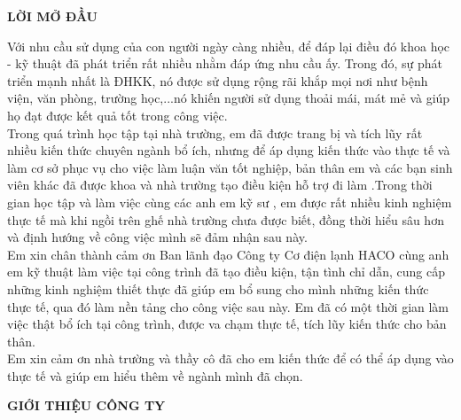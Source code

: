 \documentclass[12pt,a4paper]{article}
\begin{document}
   \begin{center}
  {\Huge \textbf{LỜI MỞ ĐẦU }}
   \end{center}
   
Với nhu cầu sử dụng của con người ngày càng nhiều, để đáp lại điều đó khoa học - kỹ thuật đã phát triển rất nhiều nhằm đáp ứng nhu cầu ấy. Trong đó, sự phát triển mạnh nhất là ĐHKK, nó được sử dụng rộng rãi khắp mọi nơi như bệnh viện, văn phòng, trường học,...nó khiến người sử dụng thoải mái, mát mẻ và giúp họ đạt được kết quả tốt trong công việc.\\

Trong quá trình học tập tại nhà trường, em đã được trang bị và tích lũy rất nhiều kiến thức chuyên ngành bổ ích, nhưng để áp dụng kiến thức vào thực tế và làm cơ sở phục vụ cho việc làm luận văn tốt nghiệp, bản thân em và các bạn sinh viên khác đã được khoa và nhà trường tạo điều kiện hỗ trợ đi làm .Trong thời gian học tập và làm việc cùng các anh em kỹ sư , em được rất nhiều kinh nghiệm thực tế mà khi ngồi trên ghế nhà trường chưa được biết, đồng thời hiểu sâu hơn và định hướng về công việc mình sẽ đảm nhận sau này.\\

Em xin chân thành cảm ơn Ban lãnh đạo Công ty Cơ điện lạnh HACO cùng anh em kỹ thuật làm việc tại công trình đã tạo điều kiện, tận tình chỉ dẫn, cung cấp những kinh nghiệm thiết thực đã giúp em bổ sung cho mình những kiến thức thực tế, qua đó làm nền tảng cho công việc sau này. Em đã có một thời gian làm việc thật bổ ích tại công trình, được va chạm thực tế, tích lũy kiến thức cho bản thân.\\

Em xin cảm ơn nhà trường và thầy cô đã cho em kiến thức để có thể áp dụng vào thực tế và giúp em hiểu thêm về ngành mình đã chọn.\\

\newpage
\begin{center}
  {\Huge \textbf{GIỚI THIỆU CÔNG TY }}
\end{center}
\end{document}
